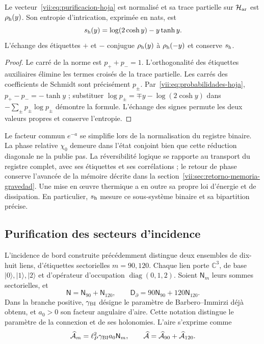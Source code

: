 \begin{proposition}
\label{vii:prop:purificacion-hoja}
Le vecteur~\eqref{vii:eq:purificacion-hoja} est normalisé et sa trace
partielle sur \(\mathcal H_{\rm ar}\) est \(\rho_{\rm h}(y)\).
Son entropie d'intrication, exprimée en nats, est
\begin{equation}
 s_{\rm h}(y)=\log(2\cosh y)-y\tanh y.
 \label{vii:eq:entropia-hoja}
\end{equation}
L'échange des étiquettes \(+\) et \(-\) conjugue
\(\rho_{\rm h}(y)\) à \(\rho_{\rm h}(-y)\) et conserve
\(s_{\rm h}\).
\end{proposition}
\begin{proof}
Le carré de la norme est \(p_++p_-=1\). L'orthogonalité des étiquettes auxiliaires élimine les termes croisés de la trace partielle. Les carrés des coefficients de Schmidt sont précisément \(p_\pm\). Par~\eqref{vii:eq:probabilidades-hoja}, \(p_+-p_-=-\tanh y\) ; substituer \(\log p_\pm=\mp y-\log(2\cosh y)\) dans \(-\sum_\pm p_\pm\log p_\pm\) démontre la formule. L'échange des signes permute les deux valeurs propres et conserve l'entropie.
\end{proof}

Le facteur commun \(e^{-a}\) se simplifie lors de la normalisation du registre binaire.
La phase relative \(\chi_0\) demeure dans l'état conjoint bien que cette
réduction diagonale ne la publie pas. La réversibilité logique se rapporte
au transport du registre complet, avec ses étiquettes et ses corrélations ;
le retour de phase conserve l'avancée de la mémoire décrite dans la
section~\ref{vii:sec:retorno-memoria-gravedad}. Une mise en œuvre thermique
a en outre sa propre loi d'énergie et de dissipation. En particulier,
\(s_{\rm h}\) mesure ce sous-système binaire et sa bipartition précise.

\subsection{Purification des secteurs d'incidence}
\label{vii:subsec:purificacion-sectorial}

L'incidence de bord construite précédemment distingue deux ensembles
de dix-huit liens, d'étiquettes sectorielles \(m=90,120\). Chaque lien
porte \(\mathbb C^3\), de base \(|0\rangle,|1\rangle,|2\rangle\)
et d'opérateur d'occupation \(\operatorname{diag}(0,1,2)\). Soient
\(\mathsf N_m\) leurs sommes sectorielles, et
\begin{equation}
 \mathsf N=\mathsf N_{90}+\mathsf N_{120},\qquad
 \mathsf D_\partial=90\mathsf N_{90}+120\mathsf N_{120}.
 \label{vii:eq:ocupaciones-sectoriales}
\end{equation}
Dans la branche positive, \(\gamma_{\rm BI}\) désigne le paramètre de Barbero--Immirzi déjà obtenu, et \(a_0>0\) son facteur angulaire d'aire. Cette notation distingue le paramètre de la connexion et de ses holonomies. L'aire s'exprime comme
\begin{equation}
 \widehat{\mathcal A}_m=\ell_P^2\gamma_{\rm BI}a_0\mathsf N_m,
 \qquad
 \widehat{\mathcal A}=\widehat{\mathcal A}_{90}
                         +\widehat{\mathcal A}_{120}.
 \label{vii:eq:area-sectores}
\end{equation}

